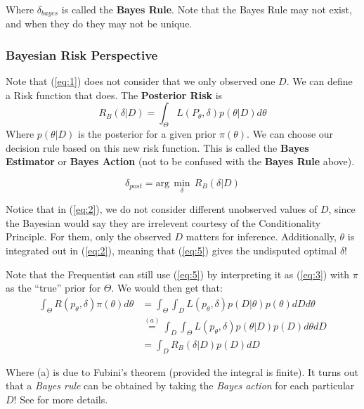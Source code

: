 \documentclass[]{article}
\theoremstyle{mattstyle}
\theoremstyle{definition}
\begin{document}
Where $\delta_{bayes}$ is called the \textbf{Bayes Rule}. Note that the Bayes Rule may not exist, and when they do they may not be unique.

\subsubsection{Bayesian Risk Perspective} 

Note that (\ref{eq:1}) does not consider that we only observed one \(D\). We can define a Risk function that does. The \textbf{Posterior Risk} is
\begin{equation}\label{eq:2}R_B(\delta|D) = \int_{\Theta}^{}L(P_{\theta},\delta)p(\theta|D)d\theta
\end{equation}
Where $p(\theta|D)$ is the posterior for a given prior $\pi(\theta)$. We can choose our decision rule based on this new risk function. This is called the \textbf{Bayes Estimator} or \textbf{Bayes Action} (not to be confused with the \textbf{Bayes Rule} above).

\begin{equation}\label{eq:5}
\delta_{post}= \text{arg}\,\min\limits_{\delta}\,R_B(\delta|D)
\end{equation}


Notice that in (\ref{eq:2}), we do not consider different unobserved values of \(D\), since the Bayesian would say they are irrelevent courtesy of the Conditionality Principle. For them, only the observed $D$ matters for inference. 
Additionally, \(\theta\) is integrated out in (\ref{eq:2}), meaning that (\ref{eq:5}) gives the undisputed optimal \(\delta\)! 

Note that the Frequentist can still use (\ref{eq:5}) by interpreting it as (\ref{eq:3}) with \(\pi\) as the ``true'' prior for \(\Theta\).
We would then get that:
\begin{align*}
\int_{\Theta}^{}R(p_\theta,\delta)\pi(\theta)d\theta &= \int_{\Theta}^{}\int_{D}L(p_\theta,\delta)p(D|\theta)p(\theta)dDd\theta \\&\overset{(a)}{=} \int_{D}^{}\int_{\Theta}L(p_\theta,\delta)p(\theta|D)p(D)d\theta dD\\
&=\int_{D}^{}R_B(\delta|D)p(D)dD
\end{align*}

Where (a) is due to Fubini's theorem (provided the integral is finite).
It turns out that a \emph{Bayes rule} can be obtained by taking the \emph{Bayes action} for each particular $D$! See \cite{PHoffNotes2} for more details.
\end{document}
